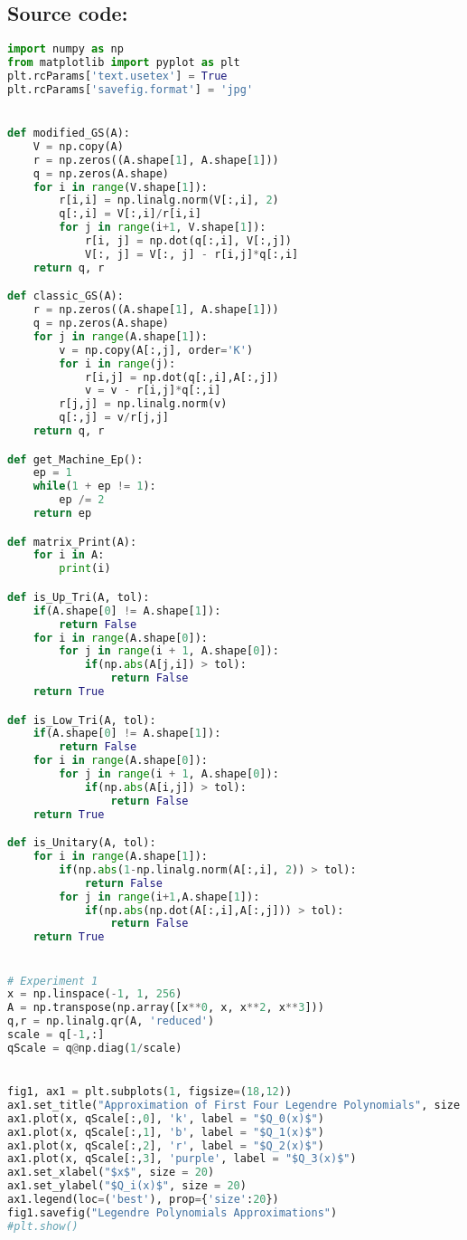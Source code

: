\documentclass{article}
\begin{document}
\subsection*{Source code:}
\begin{lstlisting}[language=python]
import numpy as np
from matplotlib import pyplot as plt
plt.rcParams['text.usetex'] = True
plt.rcParams['savefig.format'] = 'jpg'


def modified_GS(A):
	V = np.copy(A)
	r = np.zeros((A.shape[1], A.shape[1]))
	q = np.zeros(A.shape)
	for i in range(V.shape[1]):
		r[i,i] = np.linalg.norm(V[:,i], 2)
		q[:,i] = V[:,i]/r[i,i]
		for j in range(i+1, V.shape[1]):
			r[i, j] = np.dot(q[:,i], V[:,j])
			V[:, j] = V[:, j] - r[i,j]*q[:,i]
	return q, r

def classic_GS(A):
	r = np.zeros((A.shape[1], A.shape[1]))
	q = np.zeros(A.shape)
	for j in range(A.shape[1]):
		v = np.copy(A[:,j], order='K')
		for i in range(j):
			r[i,j] = np.dot(q[:,i],A[:,j])
			v = v - r[i,j]*q[:,i]
		r[j,j] = np.linalg.norm(v)
		q[:,j] = v/r[j,j]
	return q, r

def get_Machine_Ep():
	ep = 1
	while(1 + ep != 1):
		ep /= 2
	return ep

def matrix_Print(A):
	for i in A:
		print(i)

def is_Up_Tri(A, tol):
	if(A.shape[0] != A.shape[1]):
		return False
	for i in range(A.shape[0]):
		for j in range(i + 1, A.shape[0]):
			if(np.abs(A[j,i]) > tol):
				return False
	return True

def is_Low_Tri(A, tol):
	if(A.shape[0] != A.shape[1]):
		return False
	for i in range(A.shape[0]):
		for j in range(i + 1, A.shape[0]):
			if(np.abs(A[i,j]) > tol):
				return False
	return True

def is_Unitary(A, tol):
	for i in range(A.shape[1]):
		if(np.abs(1-np.linalg.norm(A[:,i], 2)) > tol):
			return False
		for j in range(i+1,A.shape[1]):
			if(np.abs(np.dot(A[:,i],A[:,j])) > tol):
			  	return False
	return True


# Experiment 1
x = np.linspace(-1, 1, 256)
A = np.transpose(np.array([x**0, x, x**2, x**3]))
q,r = np.linalg.qr(A, 'reduced')
scale = q[-1,:]
qScale = q@np.diag(1/scale)


fig1, ax1 = plt.subplots(1, figsize=(18,12))
ax1.set_title("Approximation of First Four Legendre Polynomials", size = 30)
ax1.plot(x, qScale[:,0], 'k', label = "$Q_0(x)$")
ax1.plot(x, qScale[:,1], 'b', label = "$Q_1(x)$")
ax1.plot(x, qScale[:,2], 'r', label = "$Q_2(x)$")
ax1.plot(x, qScale[:,3], 'purple', label = "$Q_3(x)$")
ax1.set_xlabel("$x$", size = 20)
ax1.set_ylabel("$Q_i(x)$", size = 20)
ax1.legend(loc=('best'), prop={'size':20})
fig1.savefig("Legendre Polynomials Approximations")
#plt.show()


\end{lstlisting}
\end{document}
